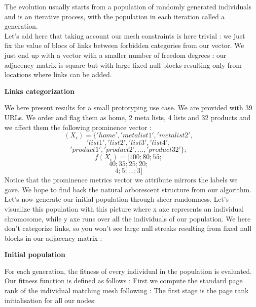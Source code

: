 \documentclass{iSWAGArticle}
\begin{document}
  The evolution usually starts from a population of randomly generated individuals and is an iterative process, with the population in each iteration called a generation.
  \\\newline
  Let's add here that taking account our mesh constraints is here trivial : we just fix the value of blocs of links between forbidden categories from our
  vector. We just end up with a vector with a smaller number of freedom degrees : our adjacency matrix is square but with large fixed null blocks resulting only from locations where links can be added.
  \begin{center}
  \textbf{\large Links categorization}
  \end{center}
  \begin{center}
  \end{center}
  We here present results for a small prototyping use case.
  We are provided with 39 URLs. We order and flag them as home, 2 meta lists, 4 lists and 32 products and we affect them
  the following prominence vector :
  $$
  \left(X_i\right)=\{'home','metalist1','metalist2',
  $$
  $$
  'list1','list2','list3','list4',
  $$
  $$
  'product1','product2',...,'product32'\};
  $$
  $$
  f\left(X_i\right) = [100;80;55;$$
  $$
  40;35;25;20;
  $$
  $$
  4;5;...;3]
  $$
  Notice that the prominence metrics vector we attribute mirrors the labels we gave. We hope to find back the natural arborescent structure from our algorithm.
  Let's now generate our initial population through sheer randomness. Let's visualize this population with this picture where x axe represents an individual chromosome, 
  while y axe runs over all the individuals of our population. We here don't categorize links, so you won't see large null streaks resulting from fixed null blocks in our adjacency matrix :
  \\\newline
  \begin{center}
  \textbf{\large Initial population}
  \end{center}
  \begin{center}
  \end{center}
  For each generation, the fitness of every individual in the population is evaluated. Our fitness function is defined as follows :
  First we compute the standard page rank of the individual matching mesh following \cite{page_rank} :
  The first stage is the page rank initialisation for all our nodes:
\end{document}
